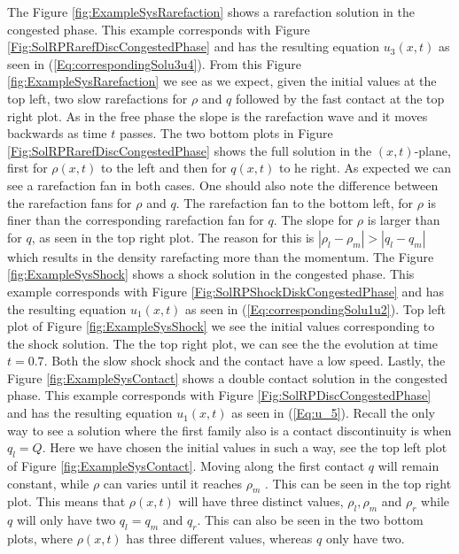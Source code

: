 \documentclass[10pt]{article}
\numberwithin{equation}{section}
\begin{document}
The Figure \ref{fig:ExampleSysRarefaction} shows a rarefaction solution in the congested phase. This example corresponds with Figure \ref{Fig:SolRPRarefDiscCongestedPhase} and has the resulting equation $u_3(x,t)$ as seen in (\ref{Eq:correspondingSolu3u4}). From this Figure \ref{fig:ExampleSysRarefaction} we see as we expect, given the initial values at the top left, two slow rarefactions for $\rho$ and $q$ followed by the fast contact at the top right plot. As in the free phase the slope is the rarefaction wave and it moves backwards as time $t$ passes.  The two bottom plots in Figure \ref{Fig:SolRPRarefDiscCongestedPhase} shows the full solution in the $(x,t)$-plane, first for $\rho(x,t)$ to the left and then for $q(x,t)$ to he right. As expected we can see a rarefaction fan in both cases. One should also note the difference between the rarefaction fans for $\rho$ and $q$. The rarefaction fan to the bottom left, for $\rho$ is finer than the corresponding rarefaction fan for $q$. The slope for $\rho$ is larger than for $q$, as seen in the top right plot. The reason for this is $|\rho_l - \rho_m| > |q_l - q_m|$ which results in the density rarefacting more than the momentum. 
The Figure \ref{fig:ExampleSysShock} shows a shock solution in the congested phase. This example corresponds with Figure \ref{Fig:SolRPShockDiskCongestedPhase} and has the resulting equation $u_1(x,t)$ as seen in (\ref{Eq:correspondingSolu1u2}). Top left plot of Figure \ref{fig:ExampleSysShock} we see the initial values corresponding to the shock solution. The the top right plot, we can see the the evolution at time $t = 0.7$. Both the slow shock shock and the contact have a low speed. 
Lastly, the Figure \ref{fig:ExampleSysContact} shows a double contact solution in the congested phase. This example corresponds with Figure \ref{Fig:SolRPDiscCongestedPhase} and has the resulting equation $u_1(x,t)$ as seen in (\ref{Eq:u_5}). Recall the only way to see a solution where the first family also is a contact discontinuity is when $q_l = Q$. Here we have chosen the initial values in such a way, see the top left plot of Figure \ref{fig:ExampleSysContact}. Moving along the first contact $q$ will remain constant, while $\rho$ can varies until it reaches $\rho_m$ . This can be seen in the top right plot. This means that $\rho(x,t)$ will have three distinct values, $\rho_l, \rho_m $ and $\rho_r$ while $q$ will only have two $q_l = q_m$ and $q_r$. This can also be seen in the two bottom plots, where $\rho(x,t)$ has three different values, whereas $q $ only have two. 
\end{document}
